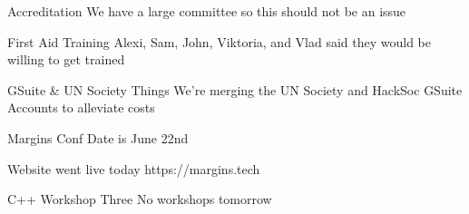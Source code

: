 \documentclass[11pt,hacksoc]{meetingmins}
\begin{document}
\begin{items}
		\subitem
		Accreditation
			\subsubitem
			We have a large committee so this should not be an issue
			
		\subitem
		First Aid Training
			\subsubitem
			Alexi, Sam, John, Viktoria, and Vlad said they would be willing to get trained
		
	\item
	GSuite \& UN Society Things
		\subitem
		We're merging the UN Society and HackSoc GSuite Accounts to alleviate costs
		
		\subitem
	
	\item
	Margins Conf
		\subitem
		Date is June 22nd
		
		\subitem
		Website went live today https://margins.tech
		
	\item
	C++ Workshop Three
		\subitem
		No workshops tomorrow
		
		\subitem

\end{items}

\vspace{1em}
\end{document}
